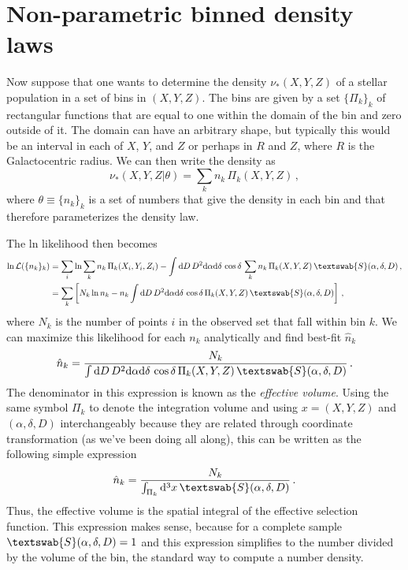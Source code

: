 \documentclass[12pt,preprint]{aastex}
\newcommand{\dd}{\mathrm{d}}
\newcommand{\dens}{\ensuremath{\nu_*}}
\newcommand{\ra}{\ensuremath{\alpha}}
\newcommand{\dec}{\ensuremath{\delta}}
\newcommand{\essf}{\ensuremath{\textswab{S}}}
\begin{document}
\section{Non-parametric binned density laws}

Now suppose that one wants to determine the density $\dens(X,Y,Z)$ of
a stellar population in a set of bins in $(X,Y,Z)$. The bins are given
by a set $\{\Pi_k\}_k$ of rectangular functions that are equal to one
within the domain of the bin and zero outside of it. The domain can
have an arbitrary shape, but typically this would be an interval in
each of $X$, $Y$, and $Z$ or perhaps in $R$ and $Z$, where $R$ is the
Galactocentric radius. We can then write the density as
\begin{equation}
  \dens(X,Y,Z|\theta) = \sum_k n_k\,\Pi_k(X,Y,Z)\,,
\end{equation}
where $\theta\equiv\{n_k\}_k$ is a set of numbers that give the
density in each bin and that therefore parameterizes the density law.

The ln likelihood then becomes
\begin{equation}
\begin{split}
  \ln \mathcal{L}(\{n_k\}_k) & = \sum_i \ln \sum_k n_k\,\Pi_k(X_i,Y_i,Z_i)
  -\int \dd D\, D^2\dd \ra \dd \dec
    \,\cos\dec\,\sum_k n_k\,\Pi_k(X,Y,Z)\,\essf(\ra,\dec,D)\,,\\
    & = \sum_k \left[ N_k \ln n_k - n_k \int \dd D\, D^2\dd \ra \dd \dec
    \,\cos\dec\,\Pi_k(X,Y,Z)\,\essf(\ra,\dec,D)\right]\,,\\
\end{split}
\end{equation}
where $N_k$ is the number of points $i$ in the observed set that fall
within bin $k$. We can maximize this likelihood for each $n_k$
analytically and find best-fit $\hat{n}_k$
\begin{equation}
  \hat{n}_k = \frac{N_k}{\int \dd D\, D^2\dd \ra \dd \dec
    \,\cos\dec\,\Pi_k(X,Y,Z)\,\essf(\ra,\dec,D)}\,.
\end{equation}
The denominator in this expression is known as the \emph{effective
  volume}. Using the same symbol $\Pi_k$ to denote the integration
volume and using $x = (X,Y,Z)$ and $(\ra,\dec,D)$ interchangeably because
they are related through coordinate transformation (as we've been
doing all along), this can be written as the following simple
expression
\begin{equation}
  \hat{n}_k = \frac{N_k}{\int_{\Pi_k} \dd^3 x\,\essf(\ra,\dec,D)}\,.
\end{equation}
Thus, the effective volume is the spatial integral of the effective
selection function. This expression makes sense, because for a
complete sample $\essf(\ra,\dec,D) = 1$ and this expression simplifies
to the number divided by the volume of the bin, the standard way to
compute a number density.
\end{document}
